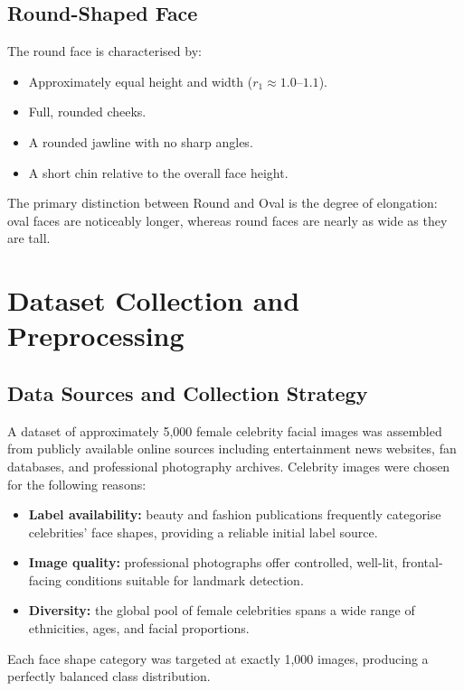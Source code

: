 \subsection{Round-Shaped Face}
The round face is characterised by:
\begin{itemize}
    \item Approximately equal height and width ($r_1 \approx 1.0$--$1.1$).
    \item Full, rounded cheeks.
    \item A rounded jawline with no sharp angles.
    \item A short chin relative to the overall face height.
\end{itemize}
The primary distinction between Round and Oval is the degree of elongation: oval faces are noticeably longer, whereas round faces are nearly as wide as they are tall.

\section{Dataset Collection and Preprocessing}
\label{sec:meth_dataset}

\subsection{Data Sources and Collection Strategy}
A dataset of approximately 5,000 female celebrity facial images was assembled from publicly available online sources including entertainment news websites, fan databases, and professional photography archives. Celebrity images were chosen for the following reasons:
\begin{itemize}
    \item \textbf{Label availability:} beauty and fashion publications frequently categorise celebrities' face shapes, providing a reliable initial label source.
    \item \textbf{Image quality:} professional photographs offer controlled, well-lit, frontal-facing conditions suitable for landmark detection.
    \item \textbf{Diversity:} the global pool of female celebrities spans a wide range of ethnicities, ages, and facial proportions.
\end{itemize}
Each face shape category was targeted at exactly 1,000 images, producing a perfectly balanced class distribution.

